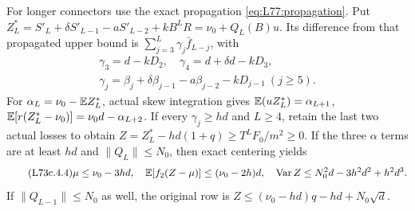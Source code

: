 For longer connectors use the exact propagation
\eqref{eq:L77:propagation}. Put
$Z_L^*=S'_L+\delta S'_{L-1}-aS'_{L-2}+kB^LR
=\nu_0+Q_L(B)u$.
Its difference from that propagated upper bound is
$\sum_{j=3}^L\gamma_j\bar f_{L-j}$, with
\begin{equation}\tag{L73c.4.2}\label{eq:L73c:losses}
\begin{gathered}
\gamma_3=d-kD_2,\quad \gamma_4=d+\delta d-kD_3,\\
\gamma_j=\beta_j+\delta\beta_{j-1}-a\beta_{j-2}-kD_{j-1}\ (j\ge5).
\end{gathered}
\end{equation}
For $\alpha_L=\nu_0-\mathbb E Z_L^*$, actual skew integration gives
$\mathbb E(uZ_L^*)=\alpha_{L+1}$,
$\mathbb E[r(Z_L^*-\nu_0)]=\nu_0d-\alpha_{L+2}$.
If every $\gamma_j\ge hd$ and $L\ge4$, retain the last two actual
losses to obtain $Z=Z_L^*-hd(1+q)\ge T^LF_0/m^2\ge0$.
If the three $\alpha$ terms are at least $hd$ and $\|Q_L\|\le N_0$,
then exact centering yields
\begin{equation}\tag{L73c.4.4}\label{eq:L73c:moments}
\mu\le\nu_0-3hd,\quad
\mathbb E[f_2(Z-\mu)]\le(\nu_0-2h)d,\quad
\operatorname{Var}Z\le N_0^2d-3h^2d^2+h^2d^3.
\end{equation}
If $\|Q_{L-1}\|\le N_0$ as well, the original row is
$Z\le(\nu_0-hd)q-hd+N_0\sqrt d$.


